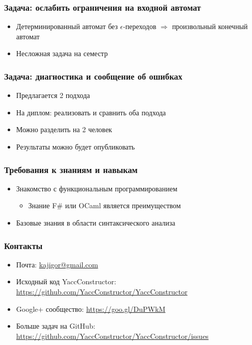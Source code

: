 \documentclass{beamer}
\begin{document}
\begin{frame}
  \transwipe[direction=90]
  \frametitle{Задача: ослабить ограничения на входной автомат}
  \begin{itemize}
    \item Детерминированный автомат без $\epsilon$-переходов $\Rightarrow$ произвольный 
конечный автомат
  \end{itemize}
  \begin{itemize}
    \item Несложная задача на семестр
  \end{itemize}
\end{frame}

\begin{frame}
  \transwipe[direction=90]
  \frametitle{Задача: диагностика и сообщение об ошибках}
  \begin{itemize}
    \item Предлагается 2 подхода
    \item На диплом: реализовать и сравнить оба подхода
    \item Можно разделить на 2 человек
    \item Результаты можно будет опубликовать
  \end{itemize}
\end{frame}

\begin{frame}
  \transwipe[direction=90]
  \frametitle{Требования к знаниям и навыкам}
  \begin{itemize}
    \item Знакомство с функциональным программированием
    \begin{itemize}
      \item Знание F\# или OCaml является преимуществом
    \end{itemize}
    \item Базовые знания в области синтаксического анализа
  \end{itemize}
\end{frame}


\begin{frame}
\transwipe[direction=90]
\frametitle{Контакты}
\begin{itemize}
  \item Почта: \url{kajigor@gmail.com}
  \item Исходный код YaccConstructor: \url{https://github.com/YaccConstructor/YaccConstructor}
  \item Google+ сообщество: \url{https://goo.gl/DuPWkM}
  \item Больше задач на GitHub: \\ \small{\url{https://github.com/YaccConstructor/YaccConstructor/issues}}
\end{itemize}
\end{frame}
\end{document}
